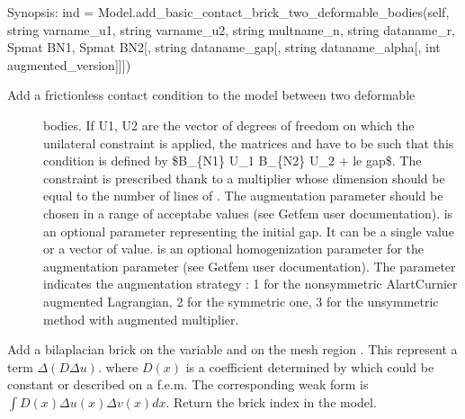 \documentclass[a4paper,11pt,english]{sphinxmanual}
\begin{document}
\begin{fulllineitems}
\begin{fulllineitems}
\label{\detokenize{python/cmdref_Model:getfem.Model.add_basic_contact_brick_two_deformable_bodies}}
Synopsis: ind = Model.add\_basic\_contact\_brick\_two\_deformable\_bodies(self, string varname\_u1, string varname\_u2, string multname\_n, string dataname\_r, Spmat BN1, Spmat BN2{[}, string dataname\_gap{[}, string dataname\_alpha{[}, int augmented\_version{]}{]}{]})
\begin{description}
\item[{Add a frictionless contact condition to the model between two deformable}] \leavevmode
bodies. If U1, U2 are the vector
of degrees of freedom on which the unilateral constraint is applied,
the matrices  and  have to be such that this condition
is defined by
\$B\_\{N1\} U\_1 B\_\{N2\} U\_2 + le gap\$. The constraint is prescribed thank
to a multiplier
 whose dimension should be equal to the number of lines of
. The augmentation parameter  should be chosen in a range of
acceptabe values (see Getfem user documentation).  is an
optional parameter representing the initial gap. It can be a single value
or a vector of value.  is an optional homogenization
parameter for the augmentation parameter
(see Getfem user documentation). The parameter  indicates
the augmentation strategy : 1 for the non\sphinxhyphen{}symmetric Alart\sphinxhyphen{}Curnier
augmented Lagrangian, 2 for the symmetric one, 3 for the unsymmetric
method with augmented multiplier.

\end{description}

\end{fulllineitems}


\begin{fulllineitems}
\label{\detokenize{python/cmdref_Model:getfem.Model.add_bilaplacian_brick}}
Add a bilaplacian brick on the variable
 and on the mesh region .
This represent a term \(\Delta(D \Delta u)\).
where \(D(x)\) is a coefficient determined by  which
could be constant or described on a f.e.m. The corresponding weak form
is \(\int D(x)\Delta u(x) \Delta v(x) dx\).
Return the brick index in the model.


\end{fulllineitems}
\end{fulllineitems}
\end{document}
